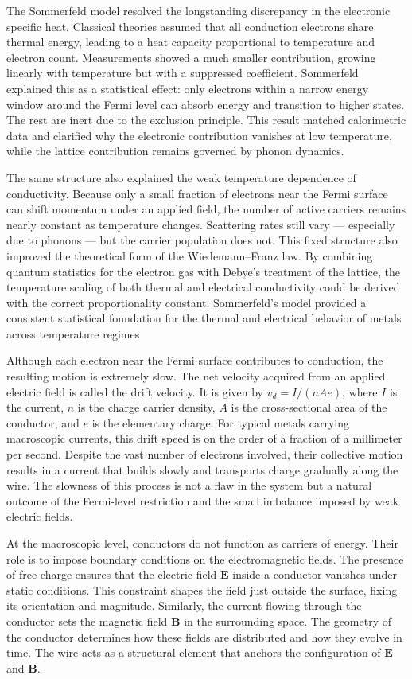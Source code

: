 The Sommerfeld model resolved the longstanding discrepancy in the electronic specific heat. Classical theories assumed that all conduction electrons share thermal energy, leading to a heat capacity proportional to temperature and electron count. Measurements showed a much smaller contribution, growing linearly with temperature but with a suppressed coefficient. Sommerfeld explained this as a statistical effect: only electrons within a narrow energy window around the Fermi level can absorb energy and transition to higher states. The rest are inert due to the exclusion principle. This result matched calorimetric data and clarified why the electronic contribution vanishes at low temperature, while the lattice contribution remains governed by phonon dynamics.

The same structure also explained the weak temperature dependence of conductivity. Because only a small fraction of electrons near the Fermi surface can shift momentum under an applied field, the number of active carriers remains nearly constant as temperature changes. Scattering rates still vary — especially due to phonons — but the carrier population does not. This fixed structure also improved the theoretical form of the Wiedemann–Franz law. By combining quantum statistics for the electron gas with Debye’s treatment of the lattice, the temperature scaling of both thermal and electrical conductivity could be derived with the correct proportionality constant. Sommerfeld’s model provided a consistent statistical foundation for the thermal and electrical behavior of metals across temperature regimes

Although each electron near the Fermi surface contributes to conduction, the resulting motion is extremely slow. The net velocity acquired from an applied electric field is called the drift velocity. It is given by $v_d = I / (n A e)$, where $I$ is the current, $n$ is the charge carrier density, $A$ is the cross-sectional area of the conductor, and $e$ is the elementary charge. For typical metals carrying macroscopic currents, this drift speed is on the order of a fraction of a millimeter per second. Despite the vast number of electrons involved, their collective motion results in a current that builds slowly and transports charge gradually along the wire. The slowness of this process is not a flaw in the system but a natural outcome of the Fermi-level restriction and the small imbalance imposed by weak electric fields.

At the macroscopic level, conductors do not function as carriers of energy. Their role is to impose boundary conditions on the electromagnetic fields. The presence of free charge ensures that the electric field $\mathbf{E}$ inside a conductor vanishes under static conditions. This constraint shapes the field just outside the surface, fixing its orientation and magnitude. Similarly, the current flowing through the conductor sets the magnetic field $\mathbf{B}$ in the surrounding space. The geometry of the conductor determines how these fields are distributed and how they evolve in time. The wire acts as a structural element that anchors the configuration of $\mathbf{E}$ and $\mathbf{B}$.

